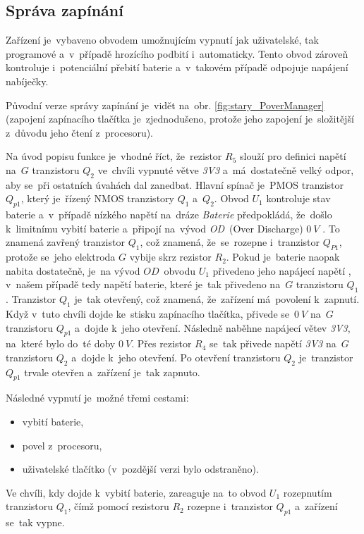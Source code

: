 \subsection{Správa zapínání}
Zařízení je~vybaveno obvodem umožnujícím vypnutí jak uživatelské, tak programové a~v~případě hrozícího podbití i~automaticky.
Tento obvod zároveň kontroluje i~potenciální přebití baterie a~v~takovém případě odpojuje napájení nabíječky.

Původní verze správy zapínání je~vidět na~obr. \ref{fig:stary_PoverManager} (zapojení zapínacího tlačítka je~zjednodušeno, protože jeho zapojení je~složitější z~důvodu jeho čtení z~procesoru).

Na úvod popisu funkce je~vhodné říct, že~rezistor \(R_{5}\) slouží pro definici napětí na~\(G\) tranzistoru \(Q_{2}\) ve~chvíli vypnuté větve {\it 3V3} a~má~dostatečně velký odpor, aby se~při ostatních úvahách dal zanedbat.
Hlavní spínač je~PMOS tranzistor \(Q_{p1}\), který je~řízený NMOS tranzistory \(Q_{1}\) a~\(Q_{2}\).
Obvod \(U_{1}\) kontroluje stav baterie a~v~případě nízkého napětí na~dráze {\it Baterie} předpokládá, že~došlo k~limitnímu vybití baterie a~připojí na~vývod {\it OD}~(Over Discharge) \(0~V\) \cite{SL8261}.
To znamená zavřený tranzistor \(Q_{1}\), což znamená, že~se~rozepne i~tranzistor \(Q_{P1}\), protože se~jeho elektroda \(G\) vybije skrz rezistor \(R_{2}\).
Pokud je~baterie naopak nabita dostatečně, je~na vývod \(OD\)~obvodu \(U_{1}\) přivedeno jeho napájecí napětí \cite{SL8261}, v~našem případě tedy napětí baterie, které je~tak přivedeno na~\(G\) tranzistoru \(Q_{1}\).
Tranzistor \(Q_{1}\) je~tak otevřený, což znamená, že~zařízení má~povolení k~zapnutí. 
Když v~tuto chvíli dojde ke~stisku zapínacího tlačítka, přivede se~\(0~V\) na~\(G\) tranzistoru \(Q_{p1}\) a~dojde k~jeho otevření.
Následně naběhne napájecí větev {\it 3V3}, na~které bylo do~té doby \(0~V\).
Přes rezistor \(R_{4}\) se~tak přivede napětí {\it 3V3} na~\(G\) tranzistoru \(Q_{2}\) a~dojde k~jeho otevření.
Po otevření tranzistoru \(Q_{2}\) je~tranzistor \(Q_{p1}\) trvale otevřen a~zařízení je~tak zapnuto.

Následné vypnutí je~možné třemi cestami:
\begin{itemize}
    \item vybití baterie,
    \item povel z~procesoru,
    \item uživatelské tlačítko (v~pozdější verzi bylo odstraněno).
\end{itemize}

Ve chvíli, kdy dojde k~vybití baterie, zareaguje na~to obvod \(U_{1}\) rozepnutím tranzistoru \(Q_{1}\), čímž pomocí rezistoru \(R_{2}\) rozepne i~tranzistor \(Q_{p1}\) a~zařízení se~tak vypne.

